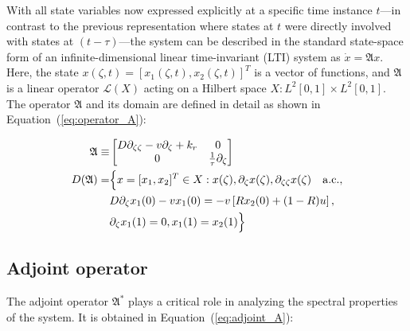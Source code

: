 With all state variables now expressed explicitly at a specific time instance $t$—in contrast to the previous representation where states at $t$ were directly involved with states at $(t-\tau)$—the system can be described in the standard state-space form of an infinite-dimensional linear time-invariant (LTI) system as $\dot{x} = \mathfrak{A} x$. Here, the state $x(\zeta, t) = [x_1(\zeta, t), x_2(\zeta, t)]^T$ is a vector of functions, and $\mathfrak{A}$ is a linear operator $\mathcal{L}(X)$ acting on a Hilbert space $X: L^2[0,1] \times L^2[0,1]$. The operator $\mathfrak{A}$ and its domain are defined in detail as shown in Equation~(\ref{eq:operator_A}):

\begin{equation} \label{eq:operator_A}
    \begin{aligned}
        \mathfrak{A} \equiv&
        \begin{bmatrix}
            D \partial_{\zeta \zeta} - v \partial_\zeta + k_r & 0 \\
            0 & \frac{1}{\tau} \partial_\zeta
        \end{bmatrix}\\
        D(\mathfrak{A}) =& \Bigl\{ x = [x_1, x_2]^T \in X:
        x(\zeta), \partial_\zeta x(\zeta), \partial_{\zeta \zeta} x(\zeta) \quad \mathrm{a.c.},\\
        &D \partial_\zeta x_1(0) - v x_1(0) = -v \left[ R x_2(0) + (1-R) u \right],\\
        &\partial_\zeta x_1(1) = 0,
        x_1(1) = x_2(1) \Bigr\}
    \end{aligned}
\end{equation}

\subsection{Adjoint operator}

The adjoint operator $\mathfrak{A}^*$ plays a critical role in analyzing the spectral properties of the system. It is obtained in Equation~(\ref{eq:adjoint_A}):

